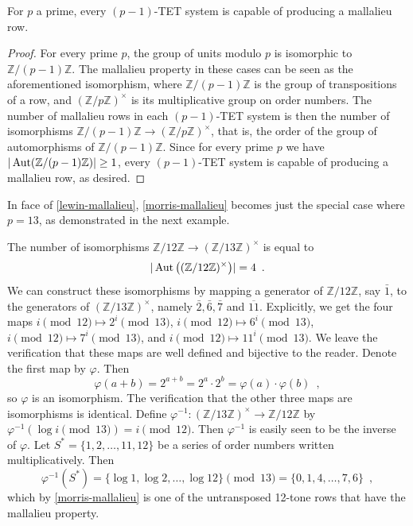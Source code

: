 \begin{proposition}
	\label{lewin-mallalieu}
	\cite[285]{Lewin1966}
	For $p$ a prime, every $(p - 1)$-TET system is capable of producing a mallalieu row.
	\begin{proof}
		For every prime $p$, the group of units modulo $p$ is isomorphic to $\mathbb{Z} / (p - 1) \mathbb{Z}$. The mallalieu property in these cases can be seen as the aforementioned isomorphism, where $\mathbb{Z} / (p - 1) \mathbb{Z}$ is the group of transpositions of a row, and $(\mathbb{Z} / p \mathbb{Z})^\times$ is its multiplicative group on order numbers. The number of mallalieu rows in each $(p - 1)$-TET system is then the number of isomorphisms $\mathbb{Z} / (p - 1) \mathbb{Z} \to (\mathbb{Z} / p \mathbb{Z})^\times$, that is, the order of the group of automorphisms of $\mathbb{Z} / (p - 1) \mathbb{Z}$. Since for every prime $p$ we have $|\operatorname{Aut}(\mathbb{Z} / (p - 1) \mathbb{Z})| \geq 1$, every $(p - 1)$-TET system is capable of producing a mallalieu row, as desired.
	\end{proof}
\end{proposition}

In face of \ref{lewin-mallalieu}, \ref{morris-mallalieu} becomes just the special case where $p = 13$, as demonstrated in the next example.

\begin{example}
	\cite[8]{Lewin1976a}
	\cite[9]{Babbitt1976}
	The number of isomorphisms $\mathbb{Z} / 12 \mathbb{Z} \to (\mathbb{Z} / 13 \mathbb{Z})^\times$ is equal to
	\begin{equation}
		|\operatorname{Aut}\big((\mathbb{Z} / 12 \mathbb{Z})^\times\big)| = 4 \enspace.
	\end{equation}
	We can construct these isomorphisms by mapping a generator of $\mathbb{Z} / 12 \mathbb{Z}$, say $\bar{1}$, to the generators of $(\mathbb{Z} / 13 \mathbb{Z})^\times$, namely $\bar{2}, \bar{6}, \bar{7}$ and $\overline{11}$. Explicitly, we get the four maps $i \pmod{12} \mapsto 2^i \pmod{13}$, $i \pmod{12} \mapsto 6^i \pmod{13}$, $i \pmod{12} \mapsto 7^i \pmod{13}$, and $i \pmod{12} \mapsto 11^i \pmod{13}$. We leave the verification that these maps are well defined and bijective to the reader. Denote the first map by $\varphi$. Then
	\begin{equation}
		\varphi(a + b) = 2^{a + b} = 2^a \cdot 2^b = \varphi(a) \cdot \varphi(b) \enspace,
	\end{equation}
	so $\varphi$ is an isomorphism. The verification that the other three maps are isomorphisms is identical. Define $\varphi^{-1} : (\mathbb{Z} / 13 \mathbb{Z})^\times \to \mathbb{Z} / 12 \mathbb{Z}$ by $\varphi^{-1}(\log i \pmod{13}) = i \pmod{12}$. Then $\varphi^{-1}$ is easily seen to be the inverse of $\varphi$. Let $S^* = \{ 1, 2, \dots, 11, 12 \}$ be a series of order numbers written multiplicatively. Then
	\begin{equation}
		\varphi^{-1}(S^*) = \{ \log 1, \log 2, \dots, \log 12 \} \pmod{13} =
		\{ 0, 1, 4, \dots, 7, 6 \} \enspace,
	\end{equation}
	which by \ref{morris-mallalieu} is one of the untransposed 12-tone rows that have the mallalieu property.
\end{example}

